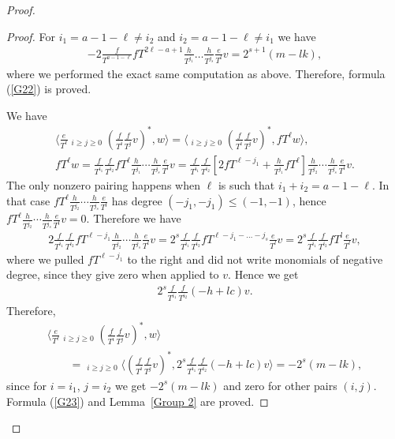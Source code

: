 \begin{proof}
\begin{proof}
For $i_1 = a-1-\ell \ne i_2$ and $i_2 = a-1-\ell \ne i_1$ we have
\begin{gather*}
- 2 \frac{f}{T^{a-1-\ell}} fT^{2\ell-a+1} \frac{h}{T^{j_1}} \dots \frac{h}{T^{j_s}} \frac{e}{T^l} v = 2^{s+1} (m - lk),
\end{gather*}
where we performed the exact same computation as above. Therefore, formula (\ref{G22}) is proved.

We have
\begin{gather*}
 \bigg\langle \frac{e}{T^{\ell}} \mathop{\sum_{i+j=a-1-\ell}}_{i\geq j\geq 0} \left(\frac{f}{T^i}\frac{f}{T^j}v\right)^*, w \bigg\rangle = \bigg\langle \mathop{\sum_{i+j=a-1-\ell}}_{i\geq j\geq 0} \left(\frac{f}{T^i}\frac{f}{T^j}v\right)^*, fT^{\ell} w \bigg\rangle, \\
fT^{\ell} w = \frac{f}{T^{i_1}}\frac{f}{T^{i_2}} fT^{\ell} \frac{h}{T^{j_1}} \cdots \frac{h}{T^{j_s}} \frac{e}{T^l} v = \frac{f}{T^{i_1}}\frac{f}{T^{i_2}} \left[ 2 fT^{\ell-j_1} +\frac{h}{T^{j_1}} fT^\ell \right] \frac{h}{T^{j_2}} \cdots \frac{h}{T^{j_s}} \frac{e}{T^l} v.
\end{gather*}
The only nonzero pairing happens when $\ell$ is such that $i_1+i_2 = a-1-\ell$. In that case $fT^{\ell} \frac{h}{T^{j_2}} \cdots \frac{h}{T^{j_s}} \frac{e}{T^l}$ has degree $(-j_1, -j_1) \leq (-1,-1)$, hence $fT^{\ell} \frac{h}{T^{j_2}} \cdots \frac{h}{T^{j_s}} \frac{e}{T^l}v=0$. Therefore we have
\begin{gather*}
2 \frac{f}{T^{i_1}}\frac{f}{T^{i_2}} fT^{\ell-j_1} \frac{h}{T^{j_2}} \cdots \frac{h}{T^{j_s}} \frac{e}{T^l} v = 2^s \frac{f}{T^{i_1}}\frac{f}{T^{i_2}} fT^{\ell-j_1 - \dots - j_s} \frac{e}{T^l} v = 2^s \frac{f}{T^{i_1}}\frac{f}{T^{i_2}} fT^{l} \frac{e}{T^l} v,
\end{gather*}
where we pulled $fT^{\ell-j_1}$ to the right and did not write monomials of negative degree, since they give zero when applied to $v$. Hence we get
\begin{gather*}
2^s \frac{f}{T^{i_1}}\frac{f}{T^{i_2}} (-h +lc) v.
\end{gather*}
Therefore,
\begin{gather*}
\bigg\langle \frac{e}{T^{\ell}} \mathop{\sum_{i+j=a-1-\ell}}_{i\geq j\geq 0} \left(\frac{f}{T^i}\frac{f}{T^j}v\right)^*, w \bigg\rangle \\
\qquad{} = \mathop{\sum_{i+j=a-1-\ell}}_{i\geq j\geq 0}\bigg\langle \left(\frac{f}{T^i}\frac{f}{T^j}v\right)^*, 2^s \frac{f}{T^{i_1}}\frac{f}{T^{i_2}} (-h +lc) v \bigg\rangle = - 2^{s} (m - lk),
\end{gather*}
since for $i = i_1$, $j = i_2$ we get $-2^s (m - lk)$ and zero for other pairs $(i,j)$. Formula (\ref{G23}) and Lemma~\ref{Group 2} are proved.
\end{proof}


\end{proof}
